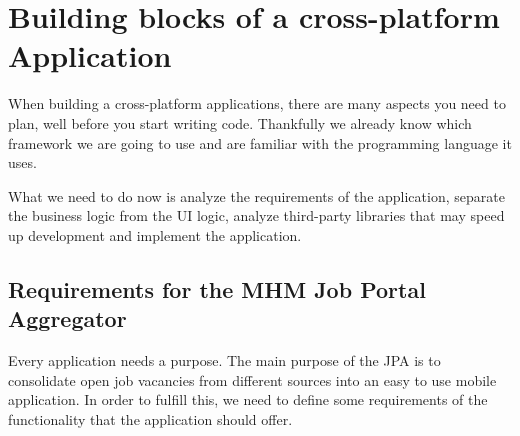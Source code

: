 \chapter{Building blocks of a cross-platform Application}\label{ch:building}

When building a cross-platform applications, there are many aspects you need to plan, well before you start writing code. Thankfully we already know which framework we are going to use and are familiar with the programming language it uses. 

What we need to do now is analyze the requirements of the application, separate the business logic from the \ac{UI} logic, analyze third-party libraries that may speed up development and implement the application.


\section{Requirements for the MHM Job Portal Aggregator}
Every application needs a purpose. The main purpose of the \ac{JPA} is to consolidate open job vacancies from different sources into an easy to use mobile application. In order to fulfill this, we need to define some requirements of the functionality that the application should offer.  

